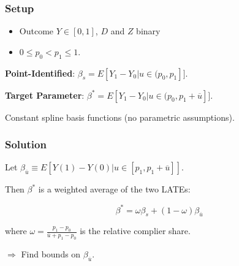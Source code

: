 \documentclass[11pt, aspectratio=169]{beamer}
\begin{document}
\begin{frame}
    \frametitle{Setup}

    \begin{itemize}
        \item Outcome $Y \in [0,1]$, $D$ and $Z$ binary
        \item $0 \leq p_0 < p_1 \leq 1$.
    \end{itemize}

    \vspace{0.5cm}

    \textbf{Point-Identified}: $\beta_s = E[Y_1 - Y_0 | u \in (p_0, p_1]]$.

    \vspace{0.5cm}

    \textbf{Target Parameter}: $\beta^* = E[Y_1 - Y_0 | u \in (p_0, p_1 + \overline{u}]]$.

    \vspace{0.5cm}

    Constant spline basis functions (no parametric assumptions).

\end{frame}

\begin{frame}
    \frametitle{Solution}

    Let $\beta_{\overline{u}} \equiv E[Y(1) - Y(0) | u \in [p_1, p_1 + \overline{u}]]$.

    \vspace{0.5cm}

    Then $\beta^*$ is a weighted average of the two LATEs:\@

    \begin{equation*}
        \beta^* = \omega\beta_s + (1-\omega)\beta_{\overline{u}}
    \end{equation*}

    where $\omega = \frac{p_1 - p_0}{\overline{u} + p_1 - p_0}$ is the relative complier share.

    \vspace{0.5cm}

    $\Rightarrow$ Find bounds on $\beta_{\overline{u}}$.

\end{frame}
\end{document}
